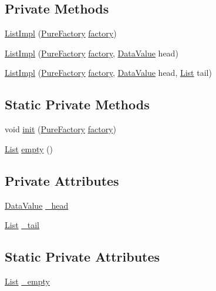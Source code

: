 \subsection*{Private Methods}
\begin{CompactItemize}
\item 
\hyperlink{classListImpl_c0}{List\-Impl} (\hyperlink{classPureFactory}{Pure\-Factory} \hyperlink{classDataImpl_o0}{factory})
\item 
\hyperlink{classListImpl_c1}{List\-Impl} (\hyperlink{classPureFactory}{Pure\-Factory} \hyperlink{classDataImpl_o0}{factory}, \hyperlink{interfaceDataValue}{Data\-Value} head)
\item 
\hyperlink{classListImpl_c2}{List\-Impl} (\hyperlink{classPureFactory}{Pure\-Factory} \hyperlink{classDataImpl_o0}{factory}, \hyperlink{interfaceDataValue}{Data\-Value} head, \hyperlink{interfaceList}{List} tail)
\end{CompactItemize}
\subsection*{Static Private Methods}
\begin{CompactItemize}
\item 
void \hyperlink{classListImpl_f0}{init} (\hyperlink{classPureFactory}{Pure\-Factory} \hyperlink{classDataImpl_o0}{factory})
\item 
\hyperlink{interfaceList}{List} \hyperlink{classListImpl_f1}{empty} ()
\end{CompactItemize}
\subsection*{Private Attributes}
\begin{CompactItemize}
\item 
\hyperlink{interfaceDataValue}{Data\-Value} \hyperlink{classListImpl_o0}{\_\-head}
\item 
\hyperlink{interfaceList}{List} \hyperlink{classListImpl_o1}{\_\-tail}
\end{CompactItemize}
\subsection*{Static Private Attributes}
\begin{CompactItemize}
\item 
\hyperlink{interfaceList}{List} \hyperlink{classListImpl_r0}{\_\-empty}
\end{CompactItemize}


